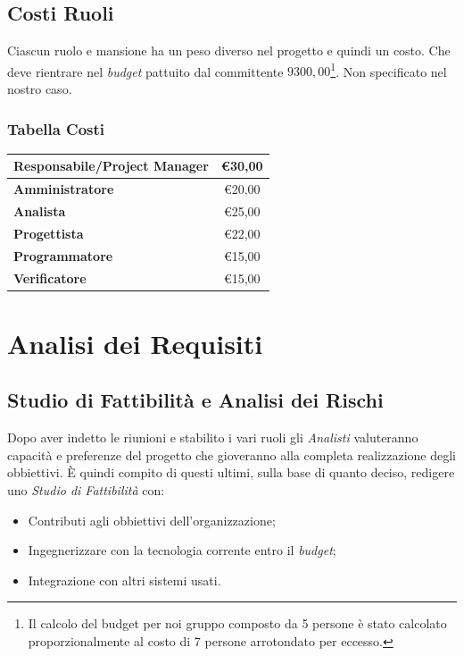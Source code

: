 \documentclass[12pt,a4paper,titlepage]{article}
\begin{document}
\subsection{Costi Ruoli}
Ciascun ruolo e mansione ha un peso diverso nel progetto e quindi un costo. Che deve rientrare nel \textit{budget} pattuito dal committente $9300,00$\footnote{Il calcolo del budget per noi gruppo composto da 5 persone è stato calcolato proporzionalmente al costo di 7 persone arrotondato per eccesso.}. Non specificato nel nostro caso.

\subsubsection{Tabella Costi}
{\renewcommand\arraystretch{1.2}  %
	\begin{tabular}{|l|c|}
		\hline
		\textbf{Responsabile/Project Manager} & \euro 30,00 \\
		\hline
		\textbf{Amministratore} & \euro 20,00 \\
		\hline
		\textbf{Analista} & \euro 25,00 \\
		\hline
		\textbf{Progettista} & \euro 22,00 \\
		\hline
		\textbf{Programmatore} & \euro 15,00 \\
		\hline
		\textbf{Verificatore} & \euro 15,00 \\
		\hline
\end{tabular}}
\vspace{0.5cm}

\newpage

\section{Analisi dei Requisiti}
\subsection{Studio di Fattibilità e Analisi dei Rischi}
Dopo aver indetto le riunioni e stabilito i vari ruoli gli \textit{Analisti} valuteranno capacità e preferenze del progetto che gioveranno alla completa realizzazione degli obbiettivi. È quindi compito di questi ultimi, sulla base di quanto deciso, redigere uno \textit{Studio di Fattibilità} con:
\begin{itemize}
	\item Contributi agli obbiettivi dell'organizzazione;
	\item Ingegnerizzare con la tecnologia corrente entro il \textit{budget};
	\item Integrazione con altri sistemi usati.
\end{itemize}
\end{document}
